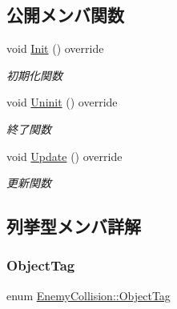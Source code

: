 \subsection*{公開メンバ関数}
\begin{DoxyCompactItemize}
\item 
void \mbox{\hyperlink{class_enemy_collision_ae5c000a30c8c4a023dd0c8e658def772}{Init}} () override
\begin{DoxyCompactList}\small\item\em 初期化関数 \end{DoxyCompactList}\item 
void \mbox{\hyperlink{class_enemy_collision_a2a194c606fd162db803c70c6fed9b9e4}{Uninit}} () override
\begin{DoxyCompactList}\small\item\em 終了関数 \end{DoxyCompactList}\item 
void \mbox{\hyperlink{class_enemy_collision_ab54133504d867c6d2070d2f3854a0aaf}{Update}} () override
\begin{DoxyCompactList}\small\item\em 更新関数 \end{DoxyCompactList}\end{DoxyCompactItemize}


\subsection{列挙型メンバ詳解}
\mbox{\label{class_enemy_collision_a8423c2c1dce9ba8ab2ba9bed82ee4843}} 
\subsubsection{\texorpdfstring{Object\+Tag}{ObjectTag}}
{\footnotesize\ttfamily enum \mbox{\hyperlink{class_enemy_collision_a8423c2c1dce9ba8ab2ba9bed82ee4843}{Enemy\+Collision\+::\+Object\+Tag}}}

